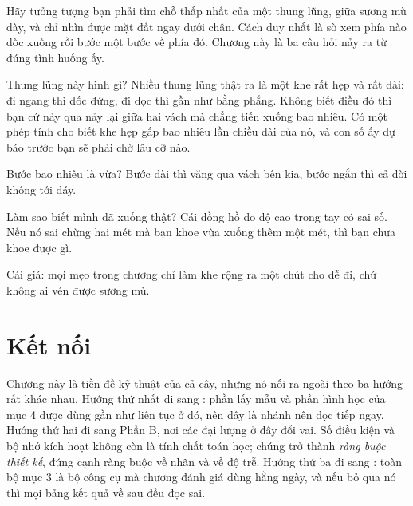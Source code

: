 \documentclass[../../deep_learning.tex]{subfiles}
\begin{document}
\begin{dongian}
Hãy tưởng tượng bạn phải tìm chỗ thấp nhất của một thung lũng, giữa sương mù dày, và chỉ nhìn được mặt đất ngay dưới chân. Cách duy nhất là sờ xem phía nào dốc xuống rồi bước một bước về phía đó. Chương này là ba câu hỏi nảy ra từ đúng tình huống ấy.

Thung lũng này hình gì? Nhiều thung lũng thật ra là một khe rất hẹp và rất dài: đi ngang thì dốc đứng, đi dọc thì gần như bằng phẳng. Không biết điều đó thì bạn cứ nảy qua nảy lại giữa hai vách mà chẳng tiến xuống bao nhiêu. Có một phép tính cho biết khe hẹp gấp bao nhiêu lần chiều dài của nó, và con số ấy dự báo trước bạn sẽ phải chờ lâu cỡ nào.

Bước bao nhiêu là vừa? Bước dài thì văng qua vách bên kia, bước ngắn thì cả đời không tới đáy.

Làm sao biết mình đã xuống thật? Cái đồng hồ đo độ cao trong tay có sai số. Nếu nó sai chừng hai mét mà bạn khoe vừa xuống thêm một mét, thì bạn chưa khoe được gì.

Cái giá: mọi mẹo trong chương chỉ làm khe rộng ra một chút cho dễ đi, chứ không ai vén được sương mù.

\end{dongian}

\section{Kết nối}
Chương này là tiền đề kỹ thuật của cả cây, nhưng nó nối ra ngoài theo ba hướng rất khác nhau. Hướng thứ nhất đi sang : phần lấy mẫu và phần hình học của mục 4 được dùng gần như liên tục ở đó, nên đây là nhánh nên đọc tiếp ngay. Hướng thứ hai đi sang Phần B, nơi các đại lượng ở đây đổi vai. Số điều kiện và bộ nhớ kích hoạt không còn là tính chất toán học; chúng trở thành \emph{ràng buộc thiết kế}, đứng cạnh ràng buộc về nhãn và về độ trễ. Hướng thứ ba đi sang : toàn bộ mục 3 là bộ công cụ mà chương đánh giá dùng hằng ngày, và nếu bỏ qua nó thì mọi bảng kết quả về sau đều đọc sai.
\end{document}
